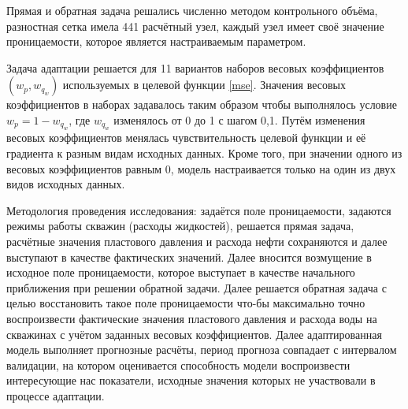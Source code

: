 \documentclass{article}
\begin{document}
Прямая и обратная задача решались численно методом контрольного объёма, разностная сетка имела 441 расчётный узел, каждый узел имеет своё значение проницаемости, которое является настраиваемым параметром.

Задача адаптации решается для 11 вариантов наборов весовых коэффициентов $(w_p, w_{q_w})$ используемых в целевой функции {\ref{mse}}. Значения весовых коэффициентов в наборах задавалось таким образом чтобы выполнялось условие $w_p = 1 - w_{q_w}$, где $w_{q_w}$ изменялось от 0 до 1 с шагом 0,1. Путём изменения весовых коэффициентов менялась чувствительность целевой функции и её градиента к разным видам исходных данных. Кроме того, при значении одного из весовых коэффициентов равным 0, модель настраивается только на один из двух видов исходных данных. 

Методология проведения исследования: задаётся поле проницаемости, задаются режимы работы скважин (расходы жидкостей), решается прямая задача, расчётные значения пластового давления и расхода нефти сохраняются и далее выступают в качестве фактических значений. Далее вносится возмущение в исходное поле проницаемости, которое выступает в качестве начального приближения при решении обратной задачи. Далее решается обратная задача с целью восстановить такое поле проницаемости что-бы максимально точно воспроизвести фактические значения пластового давления и расхода воды на скважинах с учётом заданных весовых коэффициентов. Далее адаптированная модель выполняет прогнозные расчёты, период прогноза совпадает с интервалом валидации, на котором оценивается способность модели воспроизвести интересующие нас показатели, исходные значения которых не участвовали в процессе адаптации. 
\end{document}
